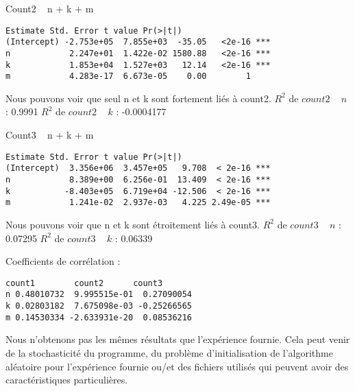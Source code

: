 Count2 ~ n + k + m
\begin{verbatim}
Estimate Std. Error t value Pr(>|t|)    
(Intercept) -2.753e+05  7.855e+03  -35.05   <2e-16 ***
n            2.247e+01  1.422e-02 1580.88   <2e-16 ***
k            1.853e+04  1.527e+03   12.14   <2e-16 ***
m            4.283e-17  6.673e-05    0.00        1    
\end{verbatim}
Nous pouvons voir que seul n et k sont fortement liés à count2.
$R^2$ de $count2$ ~ $n$ : 0.9991
$R^2$ de $count2$ ~ $k$ : -0.0004177

Count3 ~ n + k + m
\begin{verbatim}
Estimate Std. Error t value Pr(>|t|)    
(Intercept)  3.356e+06  3.457e+05   9.708  < 2e-16 ***
n            8.389e+00  6.256e-01  13.409  < 2e-16 ***
k           -8.403e+05  6.719e+04 -12.506  < 2e-16 ***
m            1.241e-02  2.937e-03   4.225 2.49e-05 ***
\end{verbatim}
Nous pouvons voir que n et k sont étroitement liés à count3.
$R^2$ de $count3$ ~ $n$ : 0.07295
$R^2$ de $count3$ ~ $k$ : 0.06339


Coefficients de corrélation :
\begin{verbatim}
count1        count2      count3
n 0.48010732  9.995515e-01  0.27090054
k 0.02803182  7.675098e-03 -0.25266565
m 0.14530334 -2.633931e-20  0.08536216
\end{verbatim}


Nous n'obtenons pas les mêmes résultats que l'expérience fournie. Cela peut venir de la stochasticité du programme, du problème d'initialisation de l'algorithme aléatoire pour l'expérience fournie ou/et des fichiers utilisés qui peuvent avoir des caractéristiques particulières.
